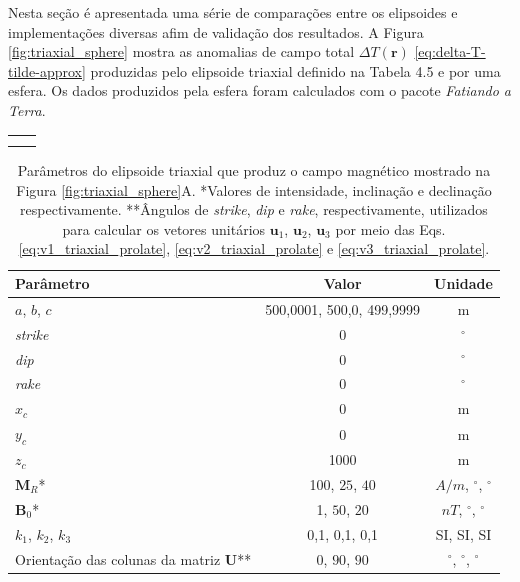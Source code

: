 Nesta seção é apresentada uma série de comparações entre os elipsoides e implementações diversas afim de validação dos resultados.
A Figura \ref{fig:triaxial_sphere} mostra as anomalias de campo total $\Delta T (\mathbf{r})$ \ref{eq:delta-T-tilde-approx} produzidas pelo elipsoide triaxial definido na Tabela 4.5 e por uma esfera. Os dados produzidos pela esfera foram calculados com o pacote \textit{Fatiando a Terra}.

\begin{table}[h!]
	\begin{center}
		\begin{tabular}{lc}
			
			&  \\
			& \\

		\end{tabular}
	\end{center}
\end{table}

\begin{table}[h!]
	\begin{center}
		\begin{tabular}{|l|c|c|}
			\hline
			\textbf{Parâmetro}  & \textbf{Valor}  & \textbf{Unidade}\\
			\hline 
			$a$, $b$, $c$   & 500,0001, 500,0, 499,9999   & m\\
			\hline
			\textit{strike}   & $0$ & $^{\circ}$\\
			\hline
			\textit{dip}    & $0$ & $^{\circ}$\\
			\hline
			\textit{rake}   & $0$  & $^{\circ}$\\
			\hline
			$x_c $   & 0  & m\\
			\hline          
			$y_c $   & 0  & m\\
			\hline                
			$z_c $   & 1000  & m\\
			\hline
			$\mathbf{M}_{R}$*  & 100, $25$, $40$  & $A/m$, $^{\circ}$, $^{\circ}$\\
			\hline
			$\mathbf{B}_{0}$*    & 1, $50$, $20$ & $nT$, $^{\circ}$, $^{\circ}$\\
			\hline
			$k_{1}$, $k_{2}$, $k_{3}$   & 0,1, 0,1, 0,1 & SI, SI, SI \\
			\hline
			Orientação das colunas da matriz $\mathbf{U}$**   & $0$, $90$, $90$  & $^{\circ}$, $^{\circ}$, $^{\circ}$\\
			\hline
		\end{tabular}
		\caption{Parâmetros do elipsoide triaxial que produz o campo magnético mostrado na Figura \ref{fig:triaxial_sphere}A. *Valores de intensidade, inclinação e declinação respectivamente. **Ângulos de \textit{strike}, \textit{dip}  e \textit{rake}, respectivamente, utilizados para calcular os vetores unitários $\mathbf{u}_{1}$, $\mathbf{u}_{2}$, $\mathbf{u}_{3}$ por meio das Eqs. \ref{eq:v1_triaxial_prolate}, \ref{eq:v2_triaxial_prolate} e \ref{eq:v3_triaxial_prolate}.}
	\end{center}
	\label{tab:triaxial_sphere}
\end{table}

